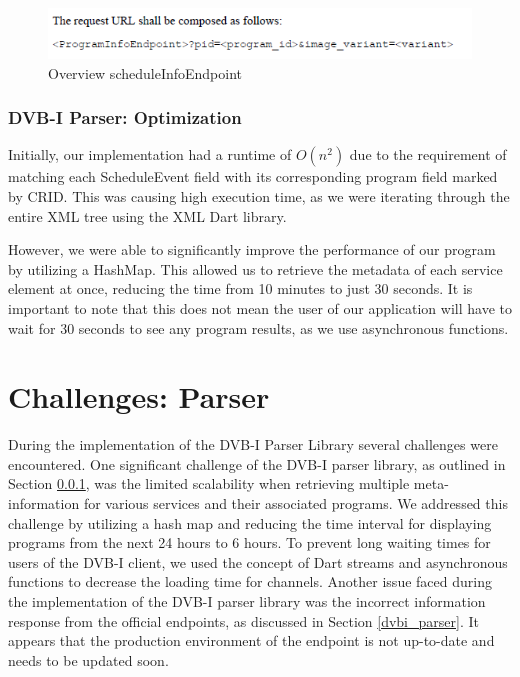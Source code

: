 \documentclass[conference]{IEEEtran}
\begin{document}


\begin{figure}[ht]
	\centerline{\includegraphics[width=\linewidth]{figures/programInfoEndpoint}}
	\caption{Overview scheduleInfoEndpoint \cite{DVBI-I}}
	\label{fig:programInfoEndpoint}
\end{figure}


\subsubsection{DVB-I Parser: Optimization}\label{dvbi opt}

Initially, our implementation had a runtime of $O(n^2)$ due to the requirement of matching each ScheduleEvent field with its corresponding program field marked by CRID. This was causing high execution time, as we were iterating through the entire XML tree using the XML Dart library.

However, we were able to significantly improve the performance of our program by utilizing a HashMap. This allowed us to retrieve the metadata of each service element at once, reducing the time from 10 minutes to just 30 seconds. It is important to note that this does not mean the user of our application will have to wait for 30 seconds to see any program results, as we use asynchronous functions.





\section{Challenges: Parser}


 

During the implementation of the DVB-I Parser Library several challenges were encountered. One significant challenge of the DVB-I parser library, as outlined in Section \ref{dvbi opt}, was the limited scalability when retrieving multiple meta-information for various services and their associated programs. We addressed this challenge by utilizing a hash map and reducing the time interval for displaying programs from the next 24 hours to 6 hours. To prevent long waiting times for users of the DVB-I client, we used the concept of Dart streams and asynchronous functions to decrease the loading time for channels.
Another issue faced during the implementation of the DVB-I parser library was the incorrect information response from the official endpoints, as discussed in Section \ref{dvbi_parser}. It appears that the production environment of the endpoint is not up-to-date and needs to be updated soon. 
\end{document}
